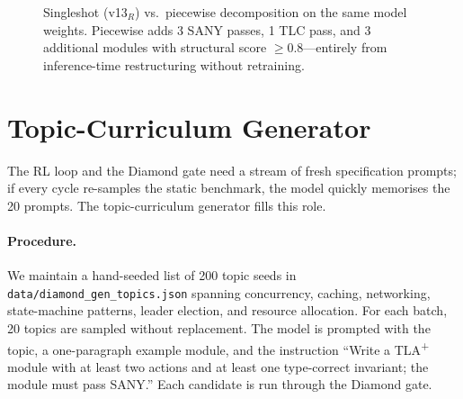 \documentclass[11pt]{article}
\begin{document}
\begin{figure}[t]
\centering
{}
\caption{Singleshot (v13$_R$) vs.\ piecewise decomposition on the same
model weights.  Piecewise adds 3 SANY passes, 1 TLC pass, and 3
additional modules with structural score $\geq 0.8$---entirely from
inference-time restructuring without retraining.}
\label{fig:singleshot-vs-piecewise}
\end{figure}

\section{Topic-Curriculum Generator}
\label{sec:gen}

The RL loop and the Diamond gate need a stream of fresh
specification prompts; if every cycle re-samples the static benchmark,
the model quickly memorises the 20 prompts.  The topic-curriculum
generator fills this role.

\paragraph{Procedure.}
We maintain a hand-seeded list of 200 topic seeds in
\texttt{data/diamond\_gen\_topics.json} spanning concurrency, caching,
networking, state-machine patterns, leader election, and resource
allocation.  For each batch, 20 topics are sampled without replacement.
The model is prompted with the topic, a one-paragraph example module,
and the instruction ``Write a TLA\textsuperscript{+} module with at
least two actions and at least one type-correct invariant; the module
must pass SANY.''  Each candidate is run through the Diamond gate.
\end{document}
